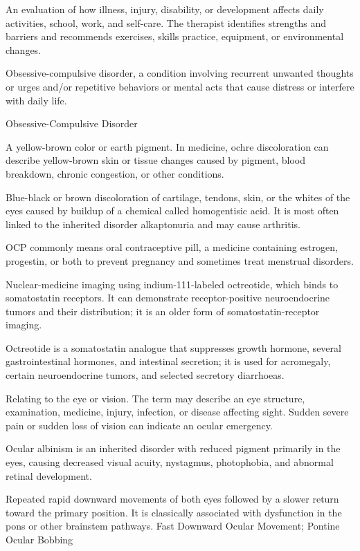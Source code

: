  An evaluation of how illness, injury, disability, or development affects daily activities, school, work, and self-care. The therapist identifies strengths and barriers and recommends exercises, skills practice, equipment, or environmental changes.

 Obsessive-compulsive disorder, a condition involving recurrent unwanted thoughts or urges and/or repetitive behaviors or mental acts that cause distress or interfere with daily life.

\synonyms
Obsessive-Compulsive Disorder

 A yellow-brown color or earth pigment. In medicine, ochre discoloration can describe yellow-brown skin or tissue changes caused by pigment, blood breakdown, chronic congestion, or other conditions.

 Blue-black or brown discoloration of cartilage, tendons, skin, or the whites of the eyes caused by buildup of a chemical called homogentisic acid. It is most often linked to the inherited disorder alkaptonuria and may cause arthritis.

 OCP commonly means oral contraceptive pill, a medicine containing estrogen, progestin, or both to prevent pregnancy and sometimes treat menstrual disorders.

 Nuclear-medicine imaging using indium-111-labeled octreotide,
which binds to somatostatin receptors. It can demonstrate receptor-positive
neuroendocrine tumors and their distribution; it is an older form of
somatostatin-receptor imaging.

 Octreotide is a somatostatin analogue that suppresses growth hormone, several gastrointestinal hormones, and intestinal secretion; it is used for acromegaly, certain neuroendocrine tumors, and selected secretory diarrhoeas.

 Relating to the eye or vision. The term may describe an eye structure, examination, medicine, injury, infection, or disease affecting sight. Sudden severe pain or sudden loss of vision can indicate an ocular emergency.

 Ocular albinism is an inherited disorder with reduced pigment primarily in the eyes, causing decreased visual acuity, nystagmus, photophobia, and abnormal retinal development.

 Repeated rapid downward movements of both eyes followed by
a slower return toward the primary position. It is classically associated with
dysfunction in the pons or other brainstem pathways.
\synonyms
Fast Downward Ocular Movement; Pontine Ocular Bobbing

